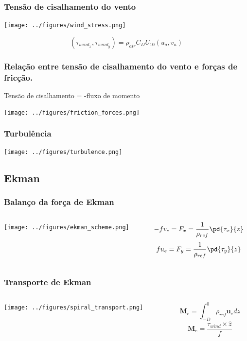 \begin{frame}
  \frametitle{Tensão de cisalhamento do vento}
  \begin{center}
    \texttt{[image: ../figures/wind\_stress.png]}
  \end{center}
  \[
    (\tau_{wind_x}, \tau_{wind_y}) = \rho_{air} C_D U_{10}(u_a, v_a)
  \]
\end{frame}


\begin{frame}
  \frametitle{Relação entre tensão de cisalhamento do vento e forças de fricção.}
  \begin{block}{}
    Tensão de cisalhamento = -fluxo de momento
  \end{block}
  \begin{center}
    \texttt{[image: ../figures/friction\_forces.png]}
  \end{center}
\end{frame}


\begin{frame}
  \frametitle{Turbulência}
  \begin{center}
    \texttt{[image: ../figures/turbulence.png]}
  \end{center}
\end{frame}


\subsection{Ekman}
\begin{frame}
  \frametitle{Balanço da força de Ekman}
  \begin{columns}
    \begin{column}{0.5\textwidth}
      \begin{center}
        \texttt{[image: ../figures/ekman\_scheme.png]}
      \end{center}
    \end{column}
    \begin{column}{0.5\textwidth}
      \[
        -fv_e = F_x = \frac{1}{\rho_{ref}}\pd{\tau_x}{z}
      \]
      \[
        fu_e = F_y = \frac{1}{\rho_{ref}}\pd{\tau_y}{z}
      \]
    \end{column}  \end{columns}
\end{frame}


\begin{frame}
  \frametitle{Transporte de Ekman}
  \begin{columns}
    \begin{column}{0.5\textwidth}
      \begin{center}
        \texttt{[image: ../figures/spiral\_transport.png]}
      \end{center}
    \end{column}
    \begin{column}{0.5\textwidth}
      \[
        \mathbf{M}_e = \int_{-D}^0 \rho_{ref}\mathbf{u}_edz
      \]
      \[
        \mathbf{M}_e = \frac{\tau_{wind} \times \hat{z}}{f}
      \]
    \end{column}  \end{columns}
\end{frame}


